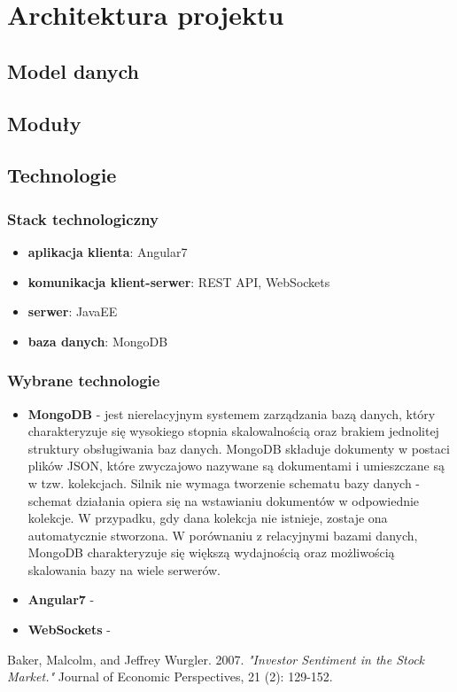 \section{Architektura projektu}
\subsection{Model danych}
\subsection{Moduły}
\subsection{Technologie}
\subsubsection{Stack technologiczny}
\begin{itemize}
  \item {\textbf{aplikacja klienta}: Angular7}
  \item {\textbf{komunikacja klient-serwer}: REST API, WebSockets}
  \item {\textbf{serwer}: JavaEE}
  \item {\textbf{baza danych}: MongoDB}
\end{itemize}
\clearpage
\subsubsection{Wybrane technologie}
\begin{itemize}
    \item {\textbf{MongoDB} - jest nierelacyjnym systemem zarządzania bazą danych, który charakteryzuje się wysokiego stopnia skalowalnością oraz brakiem jednolitej struktury obsługiwania baz danych. MongoDB składuje dokumenty w postaci plików JSON, które zwyczajowo nazywane są dokumentami i umieszczane są w tzw. kolekcjach. Silnik nie wymaga tworzenie schematu bazy danych - schemat działania opiera się na wstawianiu dokumentów w odpowiednie kolekcje. W przypadku, gdy dana kolekcja nie istnieje, zostaje ona automatycznie stworzona. W porównaniu z relacyjnymi bazami danych, MongoDB charakteryzuje się większą wydajnością oraz możliwością skalowania bazy na wiele serwerów.}
    \item {\textbf{Angular7} - }
    \item {\textbf{WebSockets} - }
\end{itemize}

\begin{thebibliography}{9}
Baker, Malcolm, and Jeffrey Wurgler. 2007. 
\textit{"Investor Sentiment in the Stock Market."}
 Journal of Economic Perspectives, 21 (2): 129-152.
\end{thebibliography}
